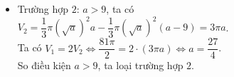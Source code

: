 \begin{ex}
{\begin{itemchoice}
\begin{itemize}
					$V_1=\pi\displaystyle\int\limits_0^9\left(\sqrt{x}\right)^2\mathrm{\,d}x=\dfrac{81\pi}{2}$ và $V_2=\dfrac{1}{3}\pi\left(\sqrt{a}\right)^2a+\dfrac{1}{3}\pi\left(\sqrt{a}\right)^2\left(9-a\right)=3\pi a$.\\
					Ta có $V_1=2V_2\Leftrightarrow\dfrac{81\pi}{2}=2\cdot3\pi a\Leftrightarrow a=\dfrac{27}{4}$.\\
					Từ đó suy ra $S=\displaystyle\int\limits_0^{\tfrac{27}{4}}\sqrt{x}\mathrm{\,d}x-\dfrac{1}{2}\cdot\dfrac{27}{4}\cdot\sqrt{\dfrac{27}{4}}=\dfrac{27\sqrt{3}}{16}$.
					\item Trường hợp $2$: $a>9$, ta có\\
					$V_2=\dfrac{1}{3}\pi\left(\sqrt{a}\right)^2a-\dfrac{1}{3}\pi\left(\sqrt{a}\right)^2(a-9)=3\pi a$.\\
					Ta có $V_1=2V_2\Leftrightarrow\dfrac{81\pi}{2}=2\cdot(3\pi a)\Leftrightarrow a=\dfrac{27}{4}$.\\
					So điều kiện $a>9$, ta loại trường hợp $2$.
				\end{itemize}
			\end{itemchoice}
		}
\end{ex}

